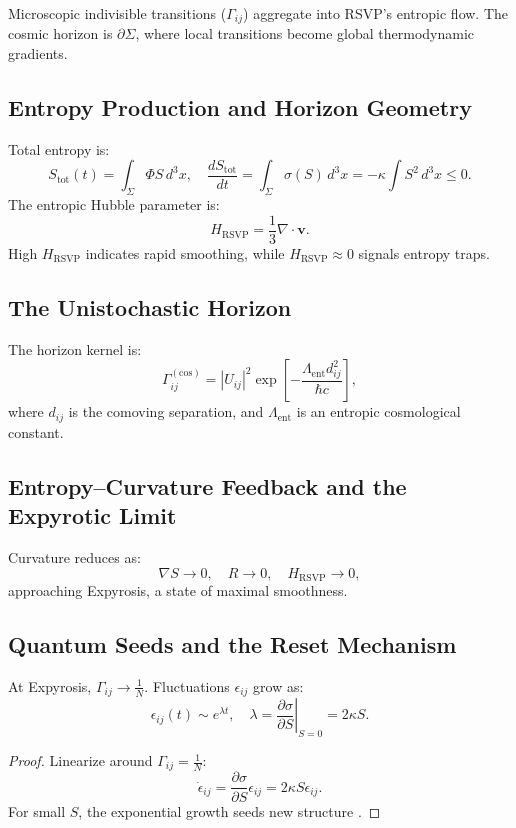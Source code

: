 \documentclass[12pt]{article}
\begin{document}
Microscopic indivisible transitions (\(\Gamma_{ij}\)) aggregate into RSVP’s entropic flow. The cosmic horizon is \(\partial \Sigma\), where local transitions become global thermodynamic gradients.

\subsection{Entropy Production and Horizon Geometry}

Total entropy is:
\[
S_{\text{tot}}(t) = \int_\Sigma \Phi S \, d^3x, \quad \frac{d S_{\text{tot}}}{dt} = \int_\Sigma \sigma(S) \, d^3x = -\kappa \int S^2 \, d^3x \leq 0.
\]
The entropic Hubble parameter is:
\[
H_{\mathrm{RSVP}} = \frac{1}{3} \nabla \cdot \mathbf{v}.
\]
High \(H_{\mathrm{RSVP}}\) indicates rapid smoothing, while \(H_{\mathrm{RSVP}} \approx 0\) signals entropy traps.

\subsection{The Unistochastic Horizon}

The horizon kernel is:
\[
\Gamma_{ij}^{(\mathrm{cos})} = |U_{ij}|^2 \exp\left[ -\frac{\Lambda_{\mathrm{ent}} d_{ij}^2}{\hbar c} \right],
\]
where \(d_{ij}\) is the comoving separation, and \(\Lambda_{\mathrm{ent}}\) is an entropic cosmological constant.

\subsection{Entropy–Curvature Feedback and the Expyrotic Limit}

Curvature reduces as:
\[
\nabla S \to 0, \quad R \to 0, \quad H_{\mathrm{RSVP}} \to 0,
\]
approaching Expyrosis, a state of maximal smoothness.

\subsection{Quantum Seeds and the Reset Mechanism}

At Expyrosis, \(\Gamma_{ij} \to \frac{1}{N}\). Fluctuations \(\epsilon_{ij}\) grow as:
\[
\epsilon_{ij}(t) \sim e^{\lambda t}, \quad \lambda = \left. \frac{\partial \sigma}{\partial S} \right|_{S=0} = 2 \kappa S.
\]

\begin{proof}
Linearize around \(\Gamma_{ij} = \frac{1}{N}\):
\[
\dot{\epsilon}_{ij} = \frac{\partial \sigma}{\partial S} \epsilon_{ij} = 2 \kappa S \epsilon_{ij}.
\]
For small \(S\), the exponential growth seeds new structure \citep{Seifert2012}.
\end{proof}
\end{document}
